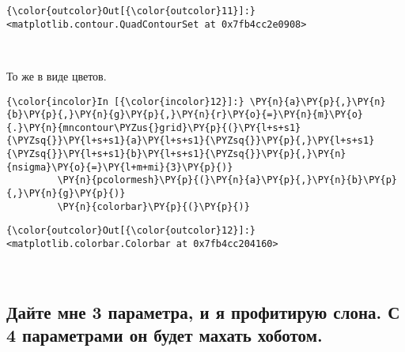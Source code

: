 \begin{Verbatim}[commandchars=\\\{\}]
{\color{outcolor}Out[{\color{outcolor}11}]:} <matplotlib.contour.QuadContourSet at 0x7fb4cc2e0908>
\end{Verbatim}
            
    \begin{center}
    \end{center}
    { \hspace*{\fill} \\}
    
    То же в виде цветов.

    \begin{Verbatim}[commandchars=\\\{\}]
{\color{incolor}In [{\color{incolor}12}]:} \PY{n}{a}\PY{p}{,}\PY{n}{b}\PY{p}{,}\PY{n}{g}\PY{p}{,}\PY{n}{r}\PY{o}{=}\PY{n}{m}\PY{o}{.}\PY{n}{mncontour\PYZus{}grid}\PY{p}{(}\PY{l+s+s1}{\PYZsq{}}\PY{l+s+s1}{a}\PY{l+s+s1}{\PYZsq{}}\PY{p}{,}\PY{l+s+s1}{\PYZsq{}}\PY{l+s+s1}{b}\PY{l+s+s1}{\PYZsq{}}\PY{p}{,}\PY{n}{nsigma}\PY{o}{=}\PY{l+m+mi}{3}\PY{p}{)}
         \PY{n}{pcolormesh}\PY{p}{(}\PY{n}{a}\PY{p}{,}\PY{n}{b}\PY{p}{,}\PY{n}{g}\PY{p}{)}
         \PY{n}{colorbar}\PY{p}{(}\PY{p}{)}
\end{Verbatim}


\begin{Verbatim}[commandchars=\\\{\}]
{\color{outcolor}Out[{\color{outcolor}12}]:} <matplotlib.colorbar.Colorbar at 0x7fb4cc204160>
\end{Verbatim}
            
    \begin{center}
    \end{center}
    { \hspace*{\fill} \\}
    
    \subsection{Дайте мне 3 параметра, и я профитирую слона. С 4 параметрами
он будет махать
хоботом.}\label{ux434ux430ux439ux442ux435-ux43cux43dux435-3-ux43fux430ux440ux430ux43cux435ux442ux440ux430-ux438-ux44f-ux43fux440ux43eux444ux438ux442ux438ux440ux443ux44e-ux441ux43bux43eux43dux430.-ux441-4-ux43fux430ux440ux430ux43cux435ux442ux440ux430ux43cux438-ux43eux43d-ux431ux443ux434ux435ux442-ux43cux430ux445ux430ux442ux44c-ux445ux43eux431ux43eux442ux43eux43c.}

